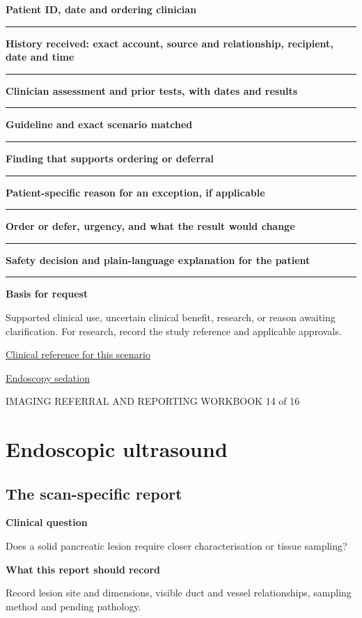 \documentclass[11pt,a4paper]{article}
\newcommand{\record}[1]{\textbf{#1}\par\vspace{0.55\baselineskip}\hrule\vspace{0.35\baselineskip}}
\begin{document}
\record{Patient ID, date and ordering clinician}

\record{History received: exact account, source and relationship, recipient, date and time}

\record{Clinician assessment and prior tests, with dates and results}

\record{Guideline and exact scenario matched}

\record{Finding that supports ordering or deferral}

\record{Patient-specific reason for an exception, if applicable}

\record{Order or defer, urgency, and what the result would change}

\record{Safety decision and plain-language explanation for the patient}

\textbf{Basis for request}\par Supported clinical use, uncertain clinical benefit, research, or reason awaiting clarification. For research, record the study reference and applicable approvals.\par

\small\href{https://pubmed.ncbi.nlm.nih.gov/39387777/}{Clinical reference for this scenario}

\quad\href{https://pmc.ncbi.nlm.nih.gov/articles/PMC10850688/}{Endoscopy sedation}

\normalsize

\newpage

{\small IMAGING REFERRAL AND REPORTING WORKBOOK \hfill 14 of 16}

\section*{Endoscopic ultrasound}

\subsection*{The scan-specific report}

\textbf{Clinical question}\par Does a solid pancreatic lesion require closer characterisation or tissue sampling?\par

\textbf{What this report should record}\par Record lesion site and dimensions, visible duct and vessel relationships, sampling method and pending pathology.\par
\end{document}
